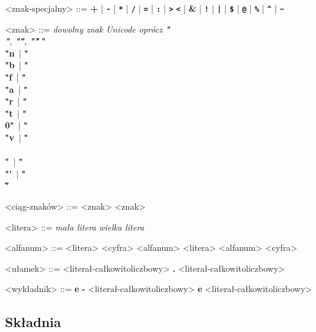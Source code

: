 \documentclass[12pt]{article}
\begin{document}
\begin{grammar}

<znak-specjalny> ::=
    \textbf{+}
    | \textbf{\texttt{-}}
    | \textbf{\texttt{*}}
    | \textbf{\texttt{/}}
    | \textbf{\texttt{=}}
    | \textbf{\texttt{:}}
    | \textbf{\texttt{\textgreater}}
    \alt \textbf{\texttt{\textless}}
    | \textbf{\&}
    | \textbf{\texttt{!}}
    | \textbf{\texttt{|}}
    | \textbf{\texttt{\$}}
    | \textbf{\texttt{@}}
    | \textbf{\texttt{\%}}
    | \textbf{\texttt{\^}}
    | \textbf{\texttt{\~}}

<znak> ::= 
    \textit{dowolny znak Unicode oprócz 
        \textbf{"\\"}, \textbf{"\""}, \textbf{"\'"}}
    \alt \textbf{"\\"n}\,
    | \textbf{"\\"b}\,
    | \textbf{"\\"f}\,
    | \textbf{"\\"a}\,
    | \textbf{"\\"r}\,
    | \textbf{"\\"t}\,
    | \textbf{"\\0"}\,
    | \textbf{"\\"v}\,
    | \textbf{"\\\\"}\,
    | \textbf{"\\"'}\,
    | \textbf{"\\\""}\,

<ciąg-znaków> ::=
    <znak>
     <znak>

<litera> ::=
    \textit{mała litera}
    \alt \textit{wielka litera}

<alfanum> ::=
    <litera>
    \alt <cyfra>
    \alt <alfanum> <litera>
    \alt <alfanum> <cyfra>

<ułamek> ::=
    <literał-całkowitoliczbowy> \textbf{.} <literał-całkowitoliczbowy>

<wykładnik> ::=
    \textbf{e} \textbf{-} <literał-całkowitoliczbowy>
    \alt \textbf{e} <literał-całkowitoliczbowy>

\end{grammar}

\subsection{Składnia}
\end{document}
